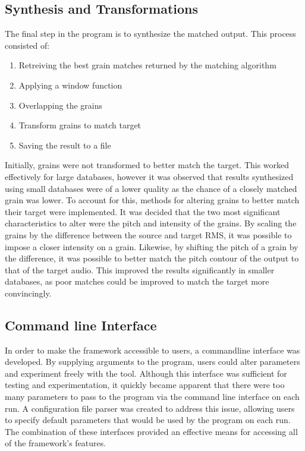 \documentclass{scrartcl}
\begin{document}
    \subsection*{Synthesis and Transformations}
    The final step in the program is to synthesize the matched output.
    This process consisted of:
    \begin{enumerate}
        \item Retreiving the best grain matches returned by the matching algorithm
        \item Applying a window function
        \item Overlapping the grains 
        \item Transform grains to match target
        \item Saving the result to a file
    \end{enumerate}
    Initially, grains were not transformed to better match the target.  This
    worked effectively for large databases, however it was observed that
    results synthesized using small databases were of a lower quality as the
    chance of a closely matched grain was lower. To account for this, methods
    for altering grains to better match their target were implemented.  It was
    decided that the two most significant characteristics to alter were the
    pitch and intensity of the grains.  By scaling the grains by the difference
    between the source and target RMS, it was possible to impose a closer
    intensity on a grain. Likewise, by shifting the pitch of a grain by the
    difference, it was possible to better match the pitch contour of the output
    to that of the target audio.  This improved the results significantly in
    smaller databases, as poor matches could be improved to match the target
    more convincingly.

    \subsection*{Command line Interface}
    In order to make the framework accessible to users, a commandline interface
    was developed. By supplying arguments to the program, users could alter
    parameters and experiment freely with the tool.  Although this interface
    was sufficient for testing and experimentation, it quickly became apparent
    that there were too many parameters to pass to the program via the command
    line interface on each run. A configuration file parser was created to
    address this issue, allowing users to specify default parameters that would
    be used by the program on each run. The combination of these interfaces
    provided an effective means for accessing all of the framework's features.
\end{document}
